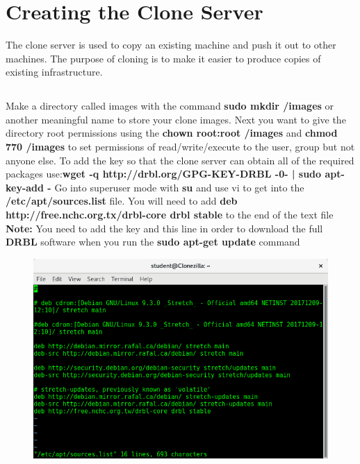 \documentclass{article}
\begin{document}
\section{Creating the Clone Server}
The clone server is used to copy an existing machine and push it out to other machines. The purpose of cloning is to make it easier to produce copies of existing infrastructure. 
\subsection{}
Make a directory called images with the command \textbf{sudo mkdir /images} or another meaningful name to store your clone images. Next you want to give the directory root permissions using the \textbf{chown root:root /images} and \textbf{chmod 770 /images} to set permissions of read/write/execute to the user, group but not anyone else.\newline \newline
To add the key so that the clone server can obtain all of the required packages use:\newline\textbf{wget -q http://drbl.org/GPG-KEY-DRBL -0- | sudo apt-key-add -}
\newline
Go into superuser mode with \textbf{su} and use vi to get into the \textbf{/etc/apt/sources.list} file. 
\newline
You will need to add \textbf{deb http://free.nchc.org.tx/drbl-core drbl stable} to the end of the text file
\newline \textbf{Note:} You need to add the key and this line in order to download the full \textbf{DRBL} software when you run the \textbf{sudo apt-get update} command
\begin{figure}[h]
	\centering
	\includegraphics[width=1\linewidth]{"Screenshots-clone-server/Screenshot from 2018-03-10 13-33-36"}
\end{figure}
\newpage
\end{document}
